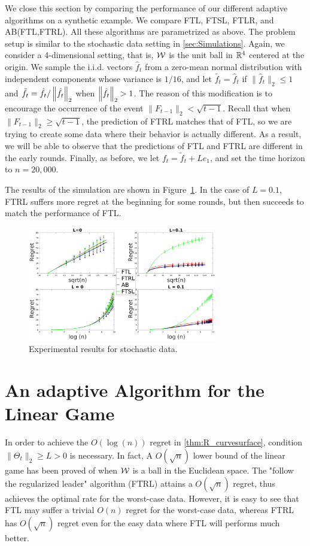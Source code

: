 We close this section by comparing the performance of our different adaptive algorithms on a synthetic example. We compare FTL, FTSL, FTLR, and AB(FTL,FTRL). All these algorithms are parametrized as above. The problem setup is similar to the stochastic data setting in \cref{sec:Simulations}. Again, we consider a 4-dimensional setting, that is, $\mathcal{W}$ is the unit ball in $\mathbb{R}^4$ centered at the origin.
We sample the i.i.d. vectors $\hat{f}_t$ from a zero-mean normal distribution with independent components whose variance is $1/16$, and let $\tilde{f_t}=\hat{f}_t$ if $\|\hat{f}_t\|_2 \le 1$ and $\tilde{f}_t = \hat{f}_t/\left\| \hat{f}_t \right\|_2$ when $\left\| \hat{f}_t \right\|_2>1$.
The reason of this modification is to encourage the occurrence of the event $\|F_{t-1}\|_2 < \sqrt{t-1}$. Recall that when $\|F_{t-1}\|_2 \ge \sqrt{t-1}$, the prediction of FTRL matches that of FTL, so we are trying to create some data where their behavior is actually different. As a result, we will be able to observe that the predictions of FTL and FTRL are different in the early rounds. Finally, as before, we let $f_t=\tilde{f}_t + L e_1$, and set the time horizon to $n=20,000$.
 

The results of the simulation are shown in Figure~\ref{res:Stoc_unitBall}. In the case of $L=0.1$, FTRL suffers more regret at the beginning for some rounds, but then succeeds to match the performance of FTL.

\begin{figure}[h]
	\centering
	\includegraphics[height = 5cm]{figures/ExpResults/Stoc_unitBall}	
	\caption{Experimental results for stochastic data. \label{res:Stoc_unitBall}}
\end{figure}


\section{An adaptive Algorithm for the Linear Game}
In order to achieve the $O(\log(n))$ regret in \cref{thm:R_curvesurface}, condition $\| \Theta_t\|_2 \ge L >0$ is necessary. 
In fact, A $O(\sqrt{n})$ lower bound of the linear game has been proved of \citet{abernethy2008optimal} when $\mathcal{W}$ is a ball in the Euclidean space.
The "follow the regularized leader" algorithm (FTRL) attains a $O(\sqrt{n})$ regret, thus achieves the optimal rate for the worst-case data.
However, it is easy to see that FTL may suffer a trivial $O(n)$ regret for the worst-case data, whereas FTRL has $O(\sqrt{n})$ regret even for the easy data where FTL will performs much better.

